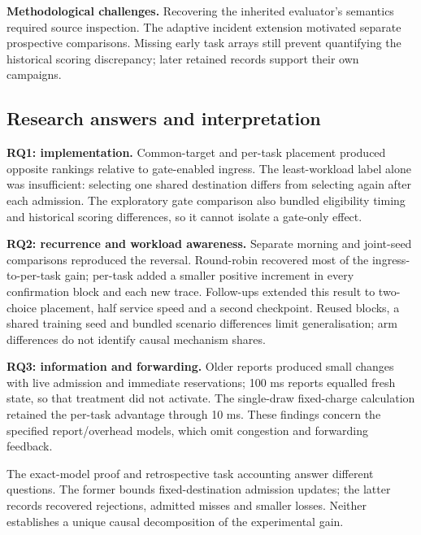 \documentclass[12pt,a4paper]{article}
\begin{document}

\textbf{Methodological challenges.} Recovering the inherited evaluator's semantics required source inspection. The adaptive incident extension motivated separate prospective comparisons. Missing early task arrays still prevent quantifying the historical scoring discrepancy; later retained records support their own campaigns.

\FloatBarrier
\subsection{Research answers and interpretation}\label{sec:4.2}

\textbf{RQ1: implementation.} Common-target and per-task placement produced opposite rankings relative to gate-enabled ingress. The least-workload label alone was insufficient: selecting one shared destination differs from selecting again after each admission. The exploratory gate comparison also bundled eligibility timing and historical scoring differences, so it cannot isolate a gate-only effect.

\textbf{RQ2: recurrence and workload awareness.} Separate morning and joint-seed comparisons reproduced the reversal. Round-robin recovered most of the ingress-to-per-task gain; per-task added a smaller positive increment in every confirmation block and each new trace. Follow-ups extended this result to two-choice placement, half service speed and a second checkpoint. Reused blocks, a shared training seed and bundled scenario differences limit generalisation; arm differences do not identify causal mechanism shares.

\textbf{RQ3: information and forwarding.} Older reports produced small changes with live admission and immediate reservations; 100 ms reports equalled fresh state, so that treatment did not activate. The single-draw fixed-charge calculation retained the per-task advantage through 10 ms. These findings concern the specified report/overhead models, which omit congestion and forwarding feedback.

The exact-model proof and retrospective task accounting answer different questions. The former bounds fixed-destination admission updates; the latter records recovered rejections, admitted misses and smaller losses. Neither establishes a unique causal decomposition of the experimental gain.
\end{document}
